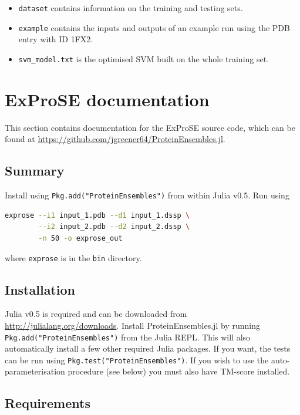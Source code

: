 \begin{itemize}
\item \verb|dataset| contains information on the training and testing sets.
\item \verb|example| contains the inputs and outputs of an example run using the PDB entry with ID 1FX2.
\item \verb|svm_model.txt| is the optimised SVM built on the whole training set.
\end{itemize}


\section{ExProSE documentation}

This section contains documentation for the ExProSE source code, which can be found at \url{https://github.com/jgreener64/ProteinEnsembles.jl}.


\subsection{Summary}

Install using \verb|Pkg.add("ProteinEnsembles")| from within Julia v0.5. Run using

\begin{lstlisting}[language=bash]
    exprose --i1 input_1.pdb --d1 input_1.dssp \
        --i2 input_2.pdb --d2 input_2.dssp \
        -n 50 -o exprose_out
\end{lstlisting}

where \verb|exprose| is in the \verb|bin| directory.


\subsection{Installation}

Julia v0.5 is required and can be downloaded from \url{http://julialang.org/downloads}. Install ProteinEnsembles.jl by running \verb|Pkg.add("ProteinEnsembles")| from the Julia REPL. This will also automatically install a few other required Julia packages. If you want, the tests can be run using \verb|Pkg.test("ProteinEnsembles")|. If you wish to use the auto-parameterisation procedure (see below) you must also have TM-score installed.


\subsection{Requirements}

